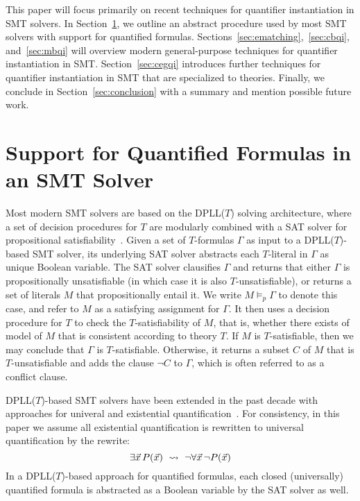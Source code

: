 \documentclass[oribibl]{llncs}
\begin{document}
This paper will focus primarily on recent techniques for quantifier instantiation in SMT solvers.
In Section~\ref{sec:quant}, we outline an abstract procedure used by most SMT solvers with support for quantified formulas.
Sections~\ref{sec:ematching},~\ref{sec:cbqi}, and~\ref{sec:mbqi} will overview modern general-purpose techniques 
for quantifier instantiation in SMT.
Section~\ref{sec:cegqi} introduces further techniques for quantifier instantiation in SMT that 
are specialized to theories.
Finally, we conclude in Section~\ref{sec:conclusion} with a summary and mention possible future work.

\section{Support for Quantified Formulas in an SMT Solver}
\label{sec:quant}

Most modern SMT solvers are based on the DPLL($T$) solving architecture,
where a set of decision procedures for $T$ are modularly combined with a SAT solver for propositional satisfiability~\cite{}.
Given a set of $T$-formulas $\Gamma$ as input to a DPLL($T$)-based SMT solver, its underlying SAT solver
abstracts each $T$-literal in $\Gamma$ as unique Boolean variable.
The SAT solver clausifies $\Gamma$ and returns that 
either $\Gamma$ is propositionally unsatisfiable (in which case it is also $T$-unsatisfiable),
or returns a set of literals $M$ that propositionally entail it.
We write $M \models_p \Gamma$ to denote this case, and refer to $M$ as a satisfying assignment for $\Gamma$.
It then uses a decision procedure for $T$ to
check the $T$-satisfiability of $M$, that is, whether there exists of model of $M$ that is consistent according to theory $T$.
If $M$ is $T$-satisfiable, then we may conclude that $\Gamma$ is $T$-satisfiable.
Otherwise, it returns a subset $C$ of $M$ that is $T$-unsatisfiable and adds the clause $\neg C$ to $\Gamma$,
which is often referred to as a conflict clause.


DPLL($T$)-based SMT solvers have been extended in the past decade with approaches for univeral and existential quantification~\cite{}.
For consistency, in this paper we assume all existential quantification is rewritten to universal quantification by the rewrite:
\[
\exists \vec x\, P( \vec x ) \ \leadsto \  \neg \forall \vec x\, \neg P( \vec x )
\]
In a DPLL($T$)-based approach for quantified formulas, 
each closed (universally) quantified formula is abstracted as a Boolean variable by the SAT solver as well.
\end{document}
